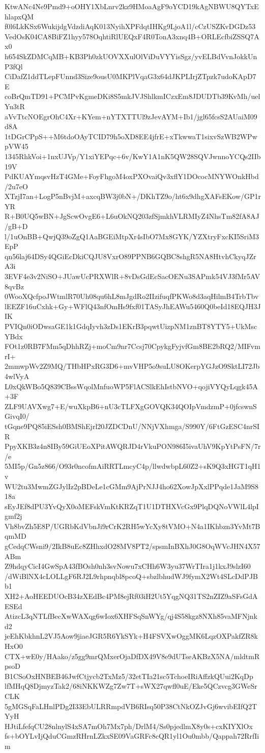 KtwANc4Ne9Pmd9+oOHY1XbLnrv2kz9HMoaAgF9oYCD19kAgNBWU8QYTxEhlapxQM
f0l6LkKSx6WukijdgVdzdiAqK013NyihXPFdqtIHKg9LjoA1l/cCzUSZKvDGDz53
VedOsK04CA8BiFZ1hyy578OqhtiRlUEQxF4R0TonA3xnq4B+ORLEcfbiZSSQ7Ax0
h654SkZDMCqMB+KB3Ph0zkUOVXXulOlViDuVYYisSgz/yvELBdVvnJokkUnP3fQl
CiDafZ1ddTLepFUnnd3Size9ousU0MKPlVqaG3x64dJKPLIrjZTpzk7udoKApD7E
coBrQmTD91+PCMPvKgmeDKi8S5mkJVJShlkmICzxEm8JDUDTb39KvMh/uelYu3tR
aVvTtcNOEgrOhC4Xr+KYem+nYTXTTUl9zJevAYM+Ib1/jgl65fcsS2AUaiM09d8A
1tDGrCPpS++M6tdoOAyTCID79h5oXD8EE4jfrE+xTkwwaT1sixvSzWB2WPwpVW45
1345RhkVoi+1nxUJVp/Y1xiYEPqc+6v/KwY1A1nK5QW28SQVJwnnoYCQs2IIb19V
PdKUAYmqsvHzT4GMe+FoyFhgoM4oxPXOvaiQv3xflY1DOcocMNYWOnkHbd/2u7eO
XTzjI7an+LogP5nBvjM+axcqBW3j0bN+/DKhTZ9o/ht6x9dhgXAFsEKow/GP1rYR
R+B0UQ5wBN+JgScwOvgE6+L6uOkNQ203zfSjmkhVLRMIyZ4NhsTm82fA8AJ/gB+D
l/1uOnBB+QwjQ39oZgQ1AaBGEiMtpXr4sIbO7Mx8GYK/YZXtryFxcKI5SriM3EpP
qn56laj64DSy4QGiEcDkiCQJU8VxrO89PPNB6GQBC8shgR5NA8HtvhCkyqJZrA3i
3EVF4e3v2NiSO+JUawUcPRXWlR+8vDsGdEcSacOENu3SAPmk54VJ3fMr5AV8qvBz
0WooXQcfpoJWtmlR70Uh08qu6hL8mJgdRo2IIzifuqfPKWo8d3aqHilmB4TrbTbv
lEEZF16uCxhk+Gy+WFlQ43nfOmHs9fxf01TASyJhEAWu5460Q0beId18EQJH3JIK
PVIQn0iODwsaGE1k1GdqIyvh3zDs1EKrB3pqwtUizpNM1znBT8YTY5+UkMscYBdx
FOt1z0RB7FMm5qDhhRZj+moCm9nr7Ccsj70CpykgFyjvfGm8BE2bRQ2/MIFvmrI+
2mmwpWv2Z9MQ/THbHPxRG3D6+mvVHP5o9suLU8OKerpYGJzO9SktLI72Jb4wlVyA
L0xQkWBo5Q839CBssWqolMnfuoWP5FlACSlkEhIstbNVO+qojiVYQyLqgk45A+3F
ZLF9UAVXwg7+E/wuXkpB6+nU3cTLFXgGOVQK34QOIpVmdzmP+0jfcswnSGivqI0/
tGqne9PQ85iESsh0BMShEjrl20JZDCDnU/NNjVXhmga/S990Y/6FtGzESC4nrSIR
PpyXKB3z4n8IBy59GiUEoXPitAWQRJD4rVkuPON986I5ivaUhV9KpYtPsFN/7r/e
5MI5p/Gn5z866/O93r0ncofmAiRRTLmcyC4p/llwdwbpL60Z2+sK9Q3xHGT1qH1v
WU2tu3MwmZGJylIz2pBDeLe1cGMm9AjPrNJJ4ho62XowJpXxlPPqde1JaM9S818a
sEyJEf8dPU3YvQyX0oMEFskVmKtKRZqT1U1DTHXVcGx9PlqDQNoVWlL4lpIgmf2j
Vh8bvZh5E8P/UGRbKdVbnJi9rCrK2RH5wYcXy8tVMO+N4a1IKhbzn3YvMt7BqmMD
gCedqCWsni9/2IkB8uEc8ZHhxdO28MV8PT2/spsmInBXhJ0G8OqWVcJHN4X57ABm
Z9hdqyCicI4GwSpA43fBOsh0nh3svNowu7xCHh6W3yu37WrTIra1j1kxJ9slzI60
/dWiBlNX4cLOLLgF6RJ2L9rhpnqbl8pcoQ+sbzlbhudWJ9fymX2Wt4SLcDdPJBb1
XH2+AoHEEDUOcB34zXEdBc4PM8ejRf03iH2Ut5YqgNQ31TS2nZIZ9aSFsGdAESEd
AtizcL3qNTLfBecXwWAXqg6wIox6XHFSqSnWYg/qj4S58kgz8NXh85vaMFNjnkd2
jeEhKbkhnL2VJ5Aow9jiaeJGR5R6YkSYk+H4FSVXwOggMK6LqzOXPakfZR8kHxO0
CTX+wE0y/HAako/z5gg9mrQMxerOjaDfDX49V8e9dUTseAKBzX5NA/mldtmRpsoD
B1CSoOxHNBEB46JwfCtjycb2TxMz5/32etTIa21sc5TchoeIRiAffzkQUui2KqDp
lfMHqQ8DjmyzTak2/68iNKKWZg7Zw7T+sWX27qwfl0uE/Eke5QCzvcg3GWeSrCLK
5gMGSqFaLHnlPDg2I33EbULRRmpdVB6RIsq50P38CtNkOZJvGj6wvibEIfQ2TYyH
HJtiLfefqCU28nlnylS4xSA7mOh7Mx7ph/DrlM4/Ss0pjedlmX8y0s+cxKIYXlOx
fs+bOYLvIjQduCGmzRHrnLZkxSE09VaGRFc8cQR1yl1Ou0mbb/Qappah72RrfIim
